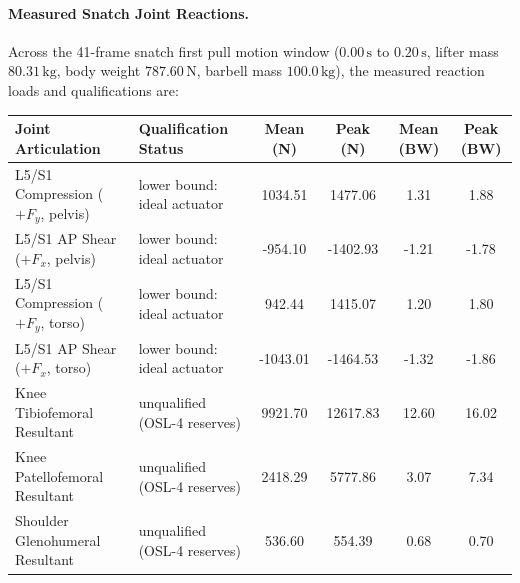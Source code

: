\documentclass[11pt,a4paper]{article}
\begin{document}
\paragraph{Measured Snatch Joint Reactions.}
Across the 41-frame snatch first pull motion window ($0.00\,\mathrm{s}$ to $0.20\,\mathrm{s}$, lifter mass $80.31\,\mathrm{kg}$, body weight $787.60\,\mathrm{N}$, barbell mass $100.0\,\mathrm{kg}$),
the measured reaction loads and qualifications are:
\begin{center}\footnotesize\setlength{\tabcolsep}{3pt}
\begin{tabular}{llcccc}
\toprule
Joint Articulation & Qualification Status & Mean (N) & Peak (N) & Mean (BW) & Peak (BW)\\
\midrule
L5/S1 Compression ($+F_y$, pelvis) & lower bound: ideal actuator & 1034.51 & 1477.06 & 1.31 & 1.88\\
L5/S1 AP Shear ($+F_x$, pelvis) & lower bound: ideal actuator & -954.10 & -1402.93 & -1.21 & -1.78\\
L5/S1 Compression ($+F_y$, torso) & lower bound: ideal actuator & 942.44 & 1415.07 & 1.20 & 1.80\\
L5/S1 AP Shear ($+F_x$, torso) & lower bound: ideal actuator & -1043.01 & -1464.53 & -1.32 & -1.86\\
Knee Tibiofemoral Resultant & unqualified (OSL-4 reserves) & 9921.70 & 12617.83 & 12.60 & 16.02\\
Knee Patellofemoral Resultant & unqualified (OSL-4 reserves) & 2418.29 & 5777.86 & 3.07 & 7.34\\
Shoulder Glenohumeral Resultant & unqualified (OSL-4 reserves) & 536.60 & 554.39 & 0.68 & 0.70\\
\bottomrule
\end{tabular}
\end{center}
\end{document}
